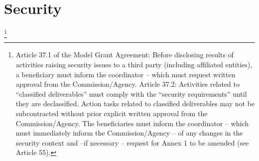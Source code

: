 \section{Security}\footnote{Article 37.1 of the Model Grant Agreement: Before disclosing results of activities raising security issues to a third party (including affiliated entities), a beneficiary must inform the coordinator -- which must request written approval from the Commission/Agency. Article 37.2: Activities related to ``classified deliverables'' must comply with the ``security requirements'' until they are declassified. Action tasks related to classified deliverables may not be subcontracted without prior explicit written approval from the Commission/Agency. The beneficiaries must inform the coordinator -- which must immediately inform the Commission/Agency -- of
any changes in the security context and --if necessary -- request for Annex 1 to be amended (see Article 55).
}
\label{sec:security}
